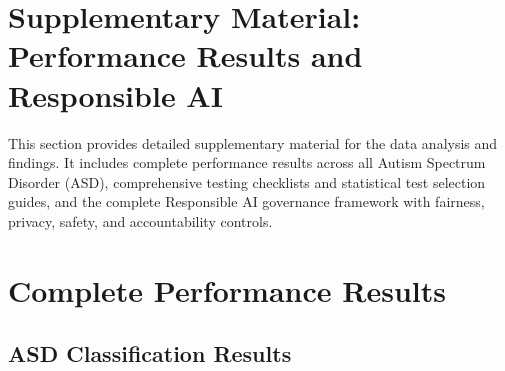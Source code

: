 
\label{app:ch4_support_appx}

\section{Supplementary Material: Performance Results and Responsible AI}

This section provides detailed supplementary material for the data analysis and findings. It includes complete performance results across all Autism Spectrum Disorder (ASD), comprehensive testing checklists and statistical test selection guides, and the complete Responsible AI governance framework with fairness, privacy, safety, and accountability controls.


\label{app:metrics}

\section{Complete Performance Results}

\subsection{ASD Classification Results}

